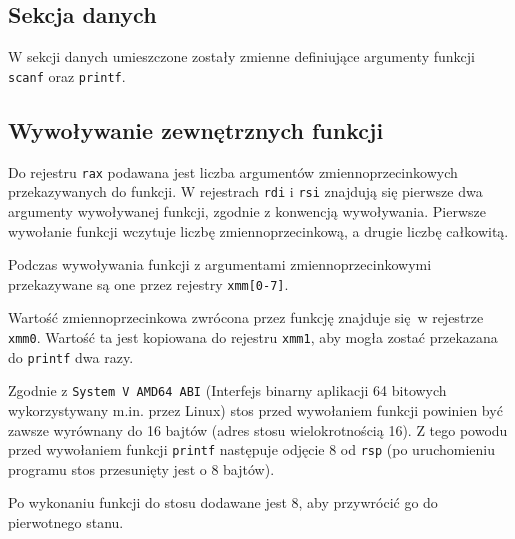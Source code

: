 \documentclass[polish, 11pt]{article}
\begin{document}
	\subsection{Sekcja danych}
		\begin{minipage}{.5\textwidth}
			W sekcji danych umieszczone zostały zmienne definiujące argumenty funkcji \verb|scanf| oraz \verb|printf|.			
		\end{minipage}%
		\hspace{1cm}
		\begin{minipage}{.5\textwidth}
			
		\end{minipage}

	\subsection{Wywoływanie zewnętrznych funkcji}	
		\begin{minipage}{.5\textwidth}
			Do rejestru \verb|rax| podawana jest liczba argumentów zmiennoprzecinkowych przekazywanych do funkcji.
			W rejestrach \verb|rdi| i \verb|rsi| znajdują się pierwsze dwa argumenty wywoływanej funkcji, zgodnie z konwencją wywoływania.
			Pierwsze wywołanie funkcji wczytuje liczbę zmiennoprzecinkową, a drugie liczbę całkowitą.

			Podczas wywoływania funkcji z argumentami zmiennoprzecinkowymi przekazywane są one przez rejestry \verb|xmm[0-7]|.

			Wartość zmiennoprzecinkowa zwrócona przez funkcję znajduje się w rejestrze \verb|xmm0|.
			Wartość ta jest kopiowana do rejestru \verb|xmm1|, aby mogła zostać przekazana do \verb|printf| dwa razy.

			Zgodnie z \verb|System V AMD64 ABI| (Interfejs binarny aplikacji 64 bitowych wykorzystywany m.in. przez Linux)
			stos przed wywołaniem funkcji powinien być zawsze wyrównany do 16 bajtów (adres stosu wielokrotnością 16).
			Z tego powodu przed wywołaniem funkcji \verb|printf| następuje odjęcie 8 od \verb|rsp|
			(po uruchomieniu programu stos przesunięty jest o 8 bajtów).

			Po wykonaniu funkcji do stosu dodawane jest 8, aby przywrócić go do pierwotnego stanu.

		\end{minipage}%
		\hspace{1cm}
		\begin{minipage}{.5\textwidth}
			
		\end{minipage}
\end{document}
